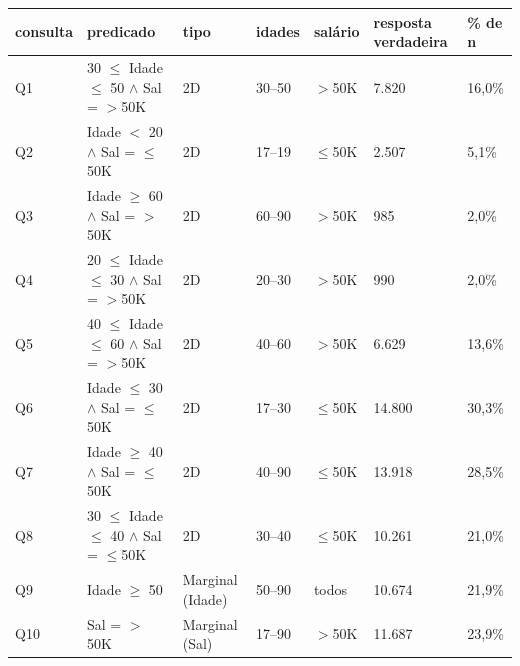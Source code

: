 \begin{tabular}{lllllll}
\toprule
consulta & predicado & tipo & idades & salário & resposta verdadeira & \% de n \\
\midrule
Q1 & 30 $\leq$ Idade $\leq$ 50 $\wedge$ Sal = $>$50K & 2D & 30–50 & $>$50K & 7.820 & 16,0\% \\
Q2 & Idade $<$ 20 $\wedge$ Sal = $\leq$50K & 2D & 17–19 & $\leq$50K & 2.507 & 5,1\% \\
Q3 & Idade $\geq$ 60 $\wedge$ Sal = $>$50K & 2D & 60–90 & $>$50K & 985 & 2,0\% \\
Q4 & 20 $\leq$ Idade $\leq$ 30 $\wedge$ Sal = $>$50K & 2D & 20–30 & $>$50K & 990 & 2,0\% \\
Q5 & 40 $\leq$ Idade $\leq$ 60 $\wedge$ Sal = $>$50K & 2D & 40–60 & $>$50K & 6.629 & 13,6\% \\
Q6 & Idade $\leq$ 30 $\wedge$ Sal = $\leq$50K & 2D & 17–30 & $\leq$50K & 14.800 & 30,3\% \\
Q7 & Idade $\geq$ 40 $\wedge$ Sal = $\leq$50K & 2D & 40–90 & $\leq$50K & 13.918 & 28,5\% \\
Q8 & 30 $\leq$ Idade $\leq$ 40 $\wedge$ Sal = $\leq$50K & 2D & 30–40 & $\leq$50K & 10.261 & 21,0\% \\
Q9 & Idade $\geq$ 50 & Marginal (Idade) & 50–90 & todos & 10.674 & 21,9\% \\
Q10 & Sal = $>$50K & Marginal (Sal) & 17–90 & $>$50K & 11.687 & 23,9\% \\
\bottomrule
\end{tabular}
